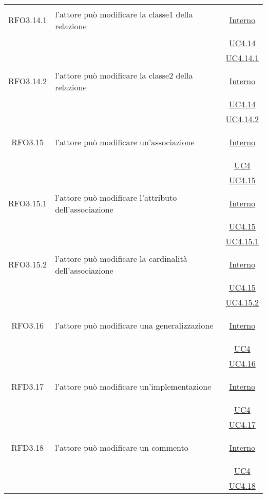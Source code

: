 \begin{longtable}{|c|>{\centering}m{7cm}|c|}
\hypertarget{RFO3.14.1}{RFO3.14.1} & l'attore può modificare la classe1 della relazione &  \hyperlink{Interno}{Interno}\\
& &\hyperref[UC4.14]{UC4.14}\\
& &\hyperref[UC4.14.1]{UC4.14.1}\\ \hline

\hypertarget{RFO3.14.2}{RFO3.14.2} & l'attore può modificare la classe2 della relazione &  \hyperlink{Interno}{Interno}\\
& &\hyperref[UC4.14]{UC4.14}\\
& &\hyperref[UC4.14.2]{UC4.14.2}\\ \hline

\hypertarget{RFO3.15}{RFO3.15} & l'attore può modificare un'associazione &  \hyperlink{Interno}{Interno}\\
& &\hyperref[UC4]{UC4}\\
& &\hyperref[UC4.15]{UC4.15}\\ \hline

\hypertarget{RFO3.15.1}{RFO3.15.1} & l'attore può modificare l'attributo dell'associazione &  \hyperlink{Interno}{Interno}\\
& &\hyperref[UC4.15]{UC4.15}\\
& &\hyperref[UC4.15.1]{UC4.15.1}\\ \hline

\hypertarget{RFO3.15.2}{RFO3.15.2} & l'attore può modificare la cardinalità dell'associazione &  \hyperlink{Interno}{Interno}\\
& &\hyperref[UC4.15]{UC4.15}\\
& &\hyperref[UC4.15.2]{UC4.15.2}\\ \hline

\hypertarget{RFO3.16}{RFO3.16} & l'attore può modificare una generalizzazione &  \hyperlink{Interno}{Interno}\\
& &\hyperref[UC4]{UC4}\\
& &\hyperref[UC4.16]{UC4.16}\\ \hline

\hypertarget{RFD3.17}{RFD3.17} & l'attore può modificare un'implementazione &  \hyperlink{Interno}{Interno}\\
& &\hyperref[UC4]{UC4}\\
& &\hyperref[UC4.17]{UC4.17}\\ \hline

\hypertarget{RFD3.18}{RFD3.18} & l'attore può modificare un commento &  \hyperlink{Interno}{Interno}\\
& &\hyperref[UC4]{UC4}\\
& &\hyperref[UC4.18]{UC4.18}\\ \hline


\end{longtable}
